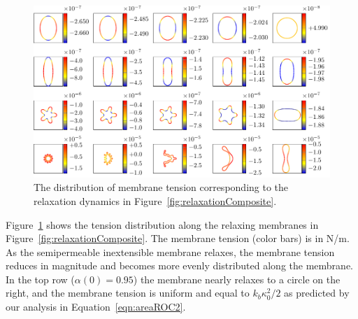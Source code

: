 \documentclass[prb,preprint,showpacs,preprintnumbers,amsmath,amssymb,longbibliography]{revtex4-1}
\newif\ifTikz
\begin{document}
\begin{figure}[htp]
  \centering
  \ifTikz
    
  \else
    \includegraphics{figures/relaxationTensions.pdf}
  \fi
  \caption{\label{fig:relaxationTensions} The distribution of membrane
  tension corresponding to the relaxation dynamics in 
  Figure~\ref{fig:relaxationComposite}.}
\end{figure}
Figure~\ref{fig:relaxationTensions} shows the tension
distribution along the relaxing membranes in
Figure~\ref{fig:relaxationComposite}. The membrane tension (color bars)
is in N/m. As the semipermeable inextensible membrane relaxes, the membrane tension
reduces in magnitude and becomes more evenly distributed along the
membrane. In the top row ($\alpha(0)=0.95$) the membrane nearly relaxes
to a circle on the right, and the membrane tension is uniform and equal
to $k_b \kappa_0^2/2$ as predicted by our analysis in
Equation~\eqref{eqn:areaROC2}. 



\end{document}
